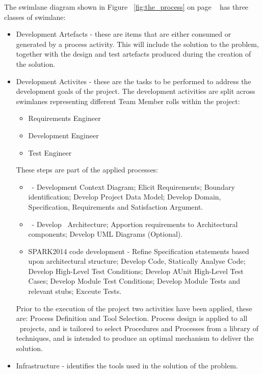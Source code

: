 The swimlane diagram shown in Figure ~\ref{fig:the_process} on page
~\pageref{fig:the_process} has three classes of swimlane:

\begin{itemize}

   \item Development Artefacts - these are items that are either consumed or generated by
         a process activity. This will include the solution to the problem, together with
         the design and test artefacts produced during the creation of the solution.

   \item Development Activites - these are the tasks to be performed to address the
         development goals of the project. The development activities are split across
         swimlanes representing different Team Member rolls within the project:

         \begin{itemize}
            \item Requirements Engineer
            \item Development Engineer
            \item Test Engineer
         \end{itemize}

    These steps are part of the applied processes:

         \begin{itemize}
            \item \reveal\ - Development Context Diagram; Elicit Requirements; Boundary
            identification; Develop Project Data Model; Develop Domain, Specification,
            Requirements and Satisfaction Argument.
            \item \informed\ - Develop \informed\ Architecture; Apportion requirements to
            Architectural components; Develop UML Diagrams (Optional).
            \item SPARK2014 code development - Refine Specification statements based upon
            architectural structure; Develop Code, Statically Analyse Code; Develop
            High-Level Test Conditions; Develop AUnit High-Level Test Cases; Develop Module
            Test Conditions; Develop Module Tests and relevant stubs; Exceute Tests.
         \end{itemize}

    Prior to the execution of the project two activities have been applied, these are: Process
    Definition and Tool Selection.  Process design is applied to all \altran\ projects, and is
    tailored to select Procedures and Processes from a library of techniques, and is intended
    to produce an optimal mechanism to deliver the solution.

    \item Infrastructure - identifies the tools used in the solution of the problem.
\end{itemize}

